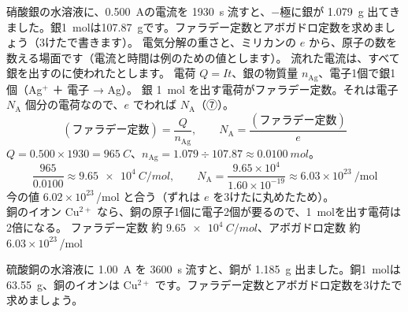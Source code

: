 \label{ph:原-1:ex7}
\begin{phreidai}[電気分解からアボガドロ定数を]
硝酸銀の水溶液に、\qty{0.500}{A}の電流を \qty{1930}{s} 流すと、−極に銀が \qty{1.079}{g} 出てきました。銀\qty{1}{mol}は\qty{107.87}{g}です。ファラデー定数とアボガドロ定数を求めましょう（3けたで書きます）。
\phbamen
電気分解の重さと、ミリカンの $e$ から、原子の数を数える場面です（電流と時間は例のための値とします）。
\phmushi
流れた電流は、すべて銀を出すのに使われたとします。
\phzu
電荷 $Q=It$、銀の物質量 $n_{\mathrm{Ag}}$、電子1個で銀1個（Ag$^+$ ＋ 電子 → Ag）。
\phriyu
銀 \qty{1}{mol} を出す電荷がファラデー定数。それは電子 $N_{\mathrm A}$ 個分の電荷なので、$e$ でわれば $N_{\mathrm A}$（⑦）。
\phtateru
\[ (\text{ファラデー定数})=\frac{Q}{n_{\mathrm{Ag}}},\qquad N_{\mathrm A}=\frac{(\text{ファラデー定数})}{e} \]
\phtoku
$Q=0.500\times1930=\qty{965}{C}$、$n_{\mathrm{Ag}}=1.079\div107.87\approx\qty{0.0100}{mol}$。
\[ \frac{965}{0.0100}\approx\qty{9.65e4}{C/mol},\qquad N_{\mathrm A}=\frac{9.65\times10^4}{1.60\times10^{-19}}\approx6.03\times10^{23}\ \mathrm{/mol} \]
\phtashikame
今の値 $6.02\times10^{23}$\,/mol と合う（ずれは $e$ を3けたに丸めたため）。\\
銅のイオン Cu$^{2+}$ なら、銅の原子1個に電子2個が要るので、\qty{1}{mol}を出す電荷は2倍になる。
\kotae ファラデー定数 約 $\qty{9.65e4}{C/mol}$、アボガドロ定数 約 $6.03\times10^{23}$\,/mol
\end{phreidai}
\begin{jibun}
硫酸銅の水溶液に \qty{1.00}{A} を \qty{3600}{s} 流すと、銅が \qty{1.185}{g} 出ました。銅\qty{1}{mol}は \qty{63.55}{g}、銅のイオンは Cu$^{2+}$ です。ファラデー定数とアボガドロ定数を3けたで求めましょう。
\end{jibun}

